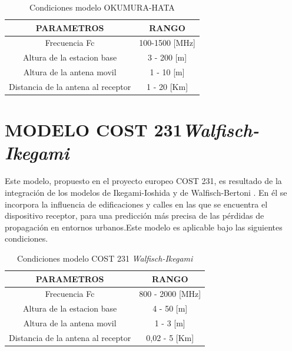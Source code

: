 \documentclass[conference, 9pt, a4paper]{IEEEtran}
\begin{document}
\begin{table}
\centering
\begin{tabular}{|c|c|}\hline  %
	PARAMETROS							& RANGO	\\ \hline   %
	Frecuencia Fc						& 100-1500 [MHz] \\ \hline 
	Altura de la estacion base			& 3 - 200  [m] \\ \hline 
	Altura de la antena movil			& 1 - 10   [m] \\ \hline
	Distancia de la antena al receptor  & 1 - 20   [Km] \\ \hline
\end{tabular}
\caption{Condiciones modelo OKUMURA-HATA}
\end{table}


\section{MODELO COST 231\textit{Walfisch-Ikegami}}

Este modelo, propuesto en el proyecto europeo COST 231, es resultado de la integración de los modelos de Ikegami-Ioshida y de Walfisch-Bertoni . En él se incorpora la influencia de edificaciones y calles en las que se encuentra el dispositivo receptor, para una predicción más precisa de las pérdidas de propagación en entornos urbanos.Este modelo es aplicable bajo las siguientes condiciones.

\begin{table}
	\centering
	\begin{tabular}{|c|c|}\hline
		PARAMETROS							& RANGO \\ \hline
		Frecuencia Fc						&  800 - 2000 [MHz] \\ \hline
		Altura de la estacion base			& 4 - 50   [m] \\ \hline 
		Altura de la antena movil			& 1 - 3    [m] \\ \hline
		Distancia de la antena al receptor	& 0,02 - 5 [Km] \\ \hline
	\end{tabular}
	\caption{Condiciones modelo COST 231 \textit{Walfisch-Ikegami}}
\end{table}
\end{document}
